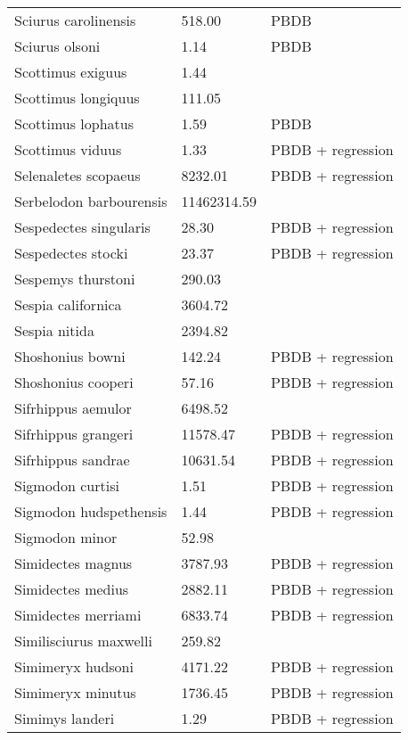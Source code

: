 \documentclass{article}
\begin{document}
\begin{center}
\begin{longtable}{p{} p{} p{}}
    Sciurus carolinensis & 518.00 & PBDB \\ 
    Sciurus olsoni & 1.14 & PBDB \\ 
    Scottimus exiguus & 1.44 & \cite{Novacek1977} \\ 
    Scottimus longiquus & 111.05 & \cite{Tomiya2013} \\ 
    Scottimus lophatus & 1.59 & PBDB \\ 
    Scottimus viduus & 1.33 & PBDB + regression \\ 
    Selenaletes scopaeus & 8232.01 & PBDB + regression \\ 
    Serbelodon barbourensis & 11462314.59 & \cite{Secord2008a} \\ 
    Sespedectes singularis & 28.30 & PBDB + regression \\ 
    Sespedectes stocki & 23.37 & PBDB + regression \\ 
    Sespemys thurstoni & 290.03 & \cite{Tomiya2013} \\ 
    Sespia californica & 3604.72 & \cite{Tomiya2013} \\ 
    Sespia nitida & 2394.82 & \cite{VanValkenburgh2007a} \\ 
    Shoshonius bowni & 142.24 & PBDB + regression \\ 
    Shoshonius cooperi & 57.16 & PBDB + regression \\ 
    Sifrhippus aemulor & 6498.52 & \cite{Osborn1933} \\ 
    Sifrhippus grangeri & 11578.47 & PBDB + regression \\ 
    Sifrhippus sandrae & 10631.54 & PBDB + regression \\ 
    Sigmodon curtisi & 1.51 & PBDB + regression \\ 
    Sigmodon hudspethensis & 1.44 & PBDB + regression \\ 
    Sigmodon minor & 52.98 & \cite{Tomiya2013} \\ 
    Simidectes magnus & 3787.93 & PBDB + regression \\ 
    Simidectes medius & 2882.11 & PBDB + regression \\ 
    Simidectes merriami & 6833.74 & PBDB + regression \\ 
    Similisciurus maxwelli & 259.82 & \cite{Tomiya2013} \\ 
    Simimeryx hudsoni & 4171.22 & PBDB + regression \\ 
    Simimeryx minutus & 1736.45 & PBDB + regression \\ 
    Simimys landeri & 1.29 & PBDB + regression \\ 

\end{longtable}
\end{center}
\end{document}
